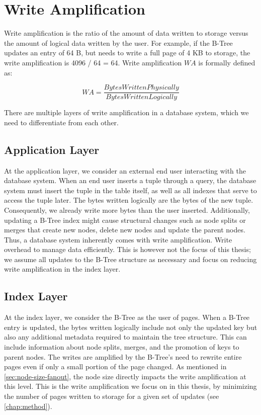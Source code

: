 \section{Write Amplification}
Write amplification is the ratio of the amount of data written to storage versus the amount of logical data written by the user.
For example, if the B-Tree updates an entry of 64 B, but needs to write a full page of 4 KB to storage, the write amplification is 4096 / 64 = 64.
Write amplification $WA$ is formally defined as:

\[
WA = \frac{Bytes Written Physically}{Bytes Written Logically}
\]

There are multiple layers of write amplification in a database system, which we need to differentiate from each other.

\subsection*{Application Layer}
At the application layer, we consider an external end user interacting with the database system.
When an end user inserts a tuple through a query, the database system must insert the tuple in the table itself, as well as all indexes that serve to access the tuple later.
The bytes written logically are the bytes of the new tuple.
Consequently, we already write more bytes than the user inserted.
Additionally, updating a B-Tree index might cause structural changes such as node splits or merges that create new nodes, delete new nodes and update the parent nodes.
Thus, a database system inherently comes with write amplification. Write overhead to manage data efficiently.
This is however not the focus of this thesis; we assume all updates to the B-Tree structure as necessary and focus on reducing write amplification in the index layer.

\subsection*{Index Layer}
At the index layer, we consider the B-Tree as the user of pages.
When a B-Tree entry is updated, the bytes written logically include not only the updated key but also any additional metadata required to maintain the tree structure.
This can include information about node splits, merges, and the promotion of keys to parent nodes.
The writes are amplified by the B-Tree's need to rewrite entire pages even if only a small portion of the page changed.
As mentioned in \autoref{sec:node-size-fanout}, the node size directly impacts the write amplification at this level.
This is the write amplification we focus on in this thesis, by minimizing the number of pages written to storage for a given set of updates (see \autoref{chap:method}).

